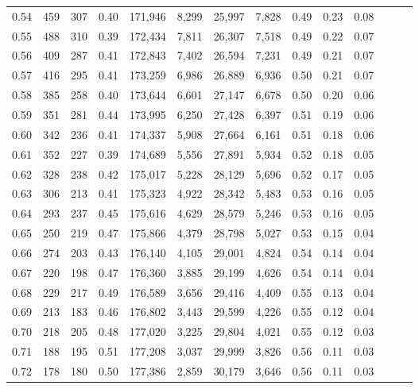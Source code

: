 \begin{tabular}{rrrrrrrrrrrrrr}
0.54 &    459 &  307 &  0.40 &  171,946 &    8,299 &  25,997 &   7,828 &  0.49 &  0.23 &      0.08 \\
0.55 &    488 &  310 &  0.39 &  172,434 &    7,811 &  26,307 &   7,518 &  0.49 &  0.22 &      0.07 \\
0.56 &    409 &  287 &  0.41 &  172,843 &    7,402 &  26,594 &   7,231 &  0.49 &  0.21 &      0.07 \\
0.57 &    416 &  295 &  0.41 &  173,259 &    6,986 &  26,889 &   6,936 &  0.50 &  0.21 &      0.07 \\
0.58 &    385 &  258 &  0.40 &  173,644 &    6,601 &  27,147 &   6,678 &  0.50 &  0.20 &      0.06 \\
0.59 &    351 &  281 &  0.44 &  173,995 &    6,250 &  27,428 &   6,397 &  0.51 &  0.19 &      0.06 \\
0.60 &    342 &  236 &  0.41 &  174,337 &    5,908 &  27,664 &   6,161 &  0.51 &  0.18 &      0.06 \\
0.61 &    352 &  227 &  0.39 &  174,689 &    5,556 &  27,891 &   5,934 &  0.52 &  0.18 &      0.05 \\
0.62 &    328 &  238 &  0.42 &  175,017 &    5,228 &  28,129 &   5,696 &  0.52 &  0.17 &      0.05 \\
0.63 &    306 &  213 &  0.41 &  175,323 &    4,922 &  28,342 &   5,483 &  0.53 &  0.16 &      0.05 \\
0.64 &    293 &  237 &  0.45 &  175,616 &    4,629 &  28,579 &   5,246 &  0.53 &  0.16 &      0.05 \\
0.65 &    250 &  219 &  0.47 &  175,866 &    4,379 &  28,798 &   5,027 &  0.53 &  0.15 &      0.04 \\
0.66 &    274 &  203 &  0.43 &  176,140 &    4,105 &  29,001 &   4,824 &  0.54 &  0.14 &      0.04 \\
0.67 &    220 &  198 &  0.47 &  176,360 &    3,885 &  29,199 &   4,626 &  0.54 &  0.14 &      0.04 \\
0.68 &    229 &  217 &  0.49 &  176,589 &    3,656 &  29,416 &   4,409 &  0.55 &  0.13 &      0.04 \\
0.69 &    213 &  183 &  0.46 &  176,802 &    3,443 &  29,599 &   4,226 &  0.55 &  0.12 &      0.04 \\
0.70 &    218 &  205 &  0.48 &  177,020 &    3,225 &  29,804 &   4,021 &  0.55 &  0.12 &      0.03 \\
0.71 &    188 &  195 &  0.51 &  177,208 &    3,037 &  29,999 &   3,826 &  0.56 &  0.11 &      0.03 \\
0.72 &    178 &  180 &  0.50 &  177,386 &    2,859 &  30,179 &   3,646 &  0.56 &  0.11 &      0.03 \\

\end{tabular}
